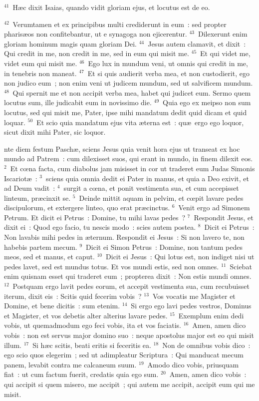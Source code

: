 ${}^{41}$~H\ae c dixit Isaias, quando vidit gloriam ejus, et locutus est de eo.


${}^{42}$~Verumtamen et ex principibus multi crediderunt in eum~: sed propter pharis\ae os non confitebantur, ut e synagoga non ejicerentur.
${}^{43}$~Dilexerunt enim gloriam hominum magis quam gloriam Dei.
${}^{44}$~Jesus autem clamavit, et dixit~: Qui credit in me, non credit in me, sed in eum qui misit me.
${}^{45}$~Et qui videt me, videt eum qui misit me.
${}^{46}$~Ego lux in mundum veni, ut omnis qui credit in me, in tenebris non maneat.
${}^{47}$~Et si quis audierit verba mea, et non custodierit, ego non judico eum~; non enim veni ut judicem mundum, sed ut salvificem mundum.
${}^{48}$~Qui spernit me et non accipit verba mea, habet qui judicet eum. Sermo quem locutus sum, ille judicabit eum in novissimo die.
${}^{49}$~Quia ego ex meipso non sum locutus, sed qui misit me, Pater, ipse mihi mandatum dedit quid dicam et quid loquar.
${}^{50}$~Et scio quia mandatum ejus vita \ae terna est~: qu\ae\ ergo ego loquor, sicut dixit mihi Pater, sic loquor.

\bchapter
{}nte diem festum Pasch\ae , sciens Jesus quia venit hora ejus ut transeat ex hoc mundo ad Patrem~: cum dilexisset suos, qui erant in mundo, in finem dilexit eos.
${}^{2}$~Et cœna facta, cum diabolus jam misisset in cor ut traderet eum Judas Simonis Iscariot\ae~:
${}^{3}$~sciens quia omnia dedit ei Pater in manus, et quia a Deo exivit, et ad Deum vadit~:
${}^{4}$~surgit a cœna, et ponit vestimenta sua, et cum accepisset linteum, pr\ae cinxit se.
${}^{5}$~Deinde mittit aquam in pelvim, et cœpit lavare pedes discipulorum, et extergere linteo, quo erat pr\ae cinctus.
${}^{6}$~Venit ergo ad Simonem Petrum. Et dicit ei Petrus~: Domine, tu mihi lavas pedes~?
${}^{7}$~Respondit Jesus, et dixit ei~: Quod ego facio, tu nescis modo~: scies autem postea.
${}^{8}$~Dicit ei Petrus~: Non lavabis mihi pedes in \ae ternum. Respondit ei Jesus~: Si non lavero te, non habebis partem mecum.
${}^{9}$~Dicit ei Simon Petrus~: Domine, non tantum pedes meos, sed et manus, et caput.
${}^{10}$~Dicit ei Jesus~: Qui lotus est, non indiget nisi ut pedes lavet, sed est mundus totus. Et vos mundi estis, sed non omnes.
${}^{11}$~Sciebat enim quisnam esset qui traderet eum~; propterea dixit~: Non estis mundi omnes.
${}^{12}$~Postquam ergo lavit pedes eorum, et accepit vestimenta sua, cum recubuisset iterum, dixit eis~: Scitis quid fecerim vobis~?
${}^{13}$~Vos vocatis me Magister et Domine, et bene dicitis~: sum etenim.
${}^{14}$~Si ergo ego lavi pedes vestros, Dominus et Magister, et vos debetis alter alterius lavare pedes.
${}^{15}$~Exemplum enim dedi vobis, ut quemadmodum ego feci vobis, ita et vos faciatis.
${}^{16}$~Amen, amen dico vobis~: non est servus major domino suo~: neque apostolus major est eo qui misit illum.
${}^{17}$~Si h\ae c scitis, beati eritis si feceritis ea.
${}^{18}$~Non de omnibus vobis dico~: ego scio quos elegerim~; sed ut adimpleatur Scriptura~: Qui manducat mecum panem, levabit contra me calcaneum suum.
${}^{19}$~Amodo dico vobis, priusquam fiat~: ut cum factum fuerit, credatis quia ego sum.
${}^{20}$~Amen, amen dico vobis~: qui accipit si quem misero, me accipit~; qui autem me accipit, accipit eum qui me misit.


